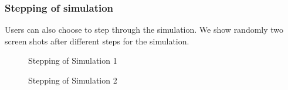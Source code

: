 \documentclass{article}
\begin{document}
\begin{normalsize}
\subsubsection{Stepping of simulation}
Users can also choose to step through the simulation. We show randomly two screen shots after different steps for the simulation.
\begin{figure}[H]
	\caption{Stepping of Simulation 1}
\end{figure}

\begin{figure}[H]
	\caption{Stepping of Simulation 2}
\end{figure}

\newpage

\end{normalsize}
\end{document}
